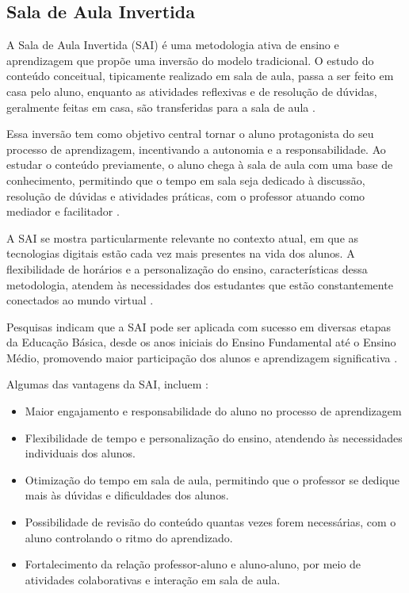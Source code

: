 \subsection{Sala de Aula Invertida}

A Sala de Aula Invertida (SAI) é uma metodologia ativa de ensino e aprendizagem que propõe uma inversão do modelo tradicional. O estudo do conteúdo conceitual, tipicamente realizado em sala de aula, passa a ser feito em casa pelo aluno, enquanto as atividades reflexivas e de resolução de dúvidas, geralmente feitas em casa, são transferidas para a sala de aula \cite{Bergmann_2016}.

Essa inversão tem como objetivo central tornar o aluno protagonista do seu processo de aprendizagem, incentivando a autonomia e a responsabilidade. Ao estudar o conteúdo previamente, o aluno chega à sala de aula com uma base de conhecimento, permitindo que o tempo em sala seja dedicado à discussão, resolução de dúvidas e atividades práticas, com o professor atuando como mediador e facilitador \cite{Pavanelo_2017}.

A SAI se mostra particularmente relevante no contexto atual, em que as tecnologias digitais estão cada vez mais presentes na vida dos alunos. A flexibilidade de horários e a personalização do ensino, características dessa metodologia, atendem às necessidades dos estudantes que estão constantemente conectados ao mundo virtual \cite{Pavanelo_2017}.

Pesquisas indicam que a SAI pode ser aplicada com sucesso em diversas etapas da Educação Básica, desde os anos iniciais do Ensino Fundamental até o Ensino Médio, promovendo maior participação dos alunos e aprendizagem significativa \cite{Muraro_2019,Sanches_2019}.

Algumas das vantagens da SAI, incluem \cite{Bergmann_2016}:
\begin{itemize}
\item Maior engajamento e responsabilidade do aluno no processo de aprendizagem 
\item Flexibilidade de tempo e personalização do ensino, atendendo às necessidades individuais dos alunos.
\item Otimização do tempo em sala de aula, permitindo que o professor se dedique mais às dúvidas e dificuldades dos alunos.
\item Possibilidade de revisão do conteúdo quantas vezes forem necessárias, com o aluno controlando o ritmo do aprendizado.
\item Fortalecimento da relação professor-aluno e aluno-aluno, por meio de atividades colaborativas e interação em sala de aula.    
\end{itemize}

